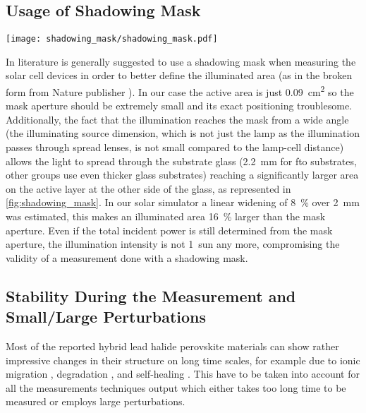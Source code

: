 	\subsection{Usage of Shadowing Mask}

		\begin{SCfigure}
			\centering
			\texttt{[image: shadowing\_mask/shadowing\_mask.pdf]}
			\label{fig:shadowing_mask}
		\end{SCfigure}

		In literature is generally suggested to use a shadowing mask when measuring the solar cell devices in order to better define the illuminated area (as in the broken \cite{Brinser2017} form from Nature publisher \cite{NatureResearch2017}).
		In our case the active area is just \SI{0.09}{\square\cm} so the mask aperture should be extremely small and its exact positioning troublesome.
		Additionally, the fact that the illumination reaches the mask from a wide angle (the illuminating source dimension, which is not just the lamp as the illumination passes through spread lenses, is not small compared to the lamp-cell distance) allows the light to spread through the substrate glass (\SI{2.2}{\mm} for \gls{fto} substrates, other groups use even thicker glass substrates) reaching a significantly larger area on the active layer at the other side of the glass, as represented in \cref{fig:shadowing_mask}.
		In our solar simulator a linear widening of 8~\% over \SI{2}{\mm} was estimated, this makes an illuminated area 16~\% larger than the mask aperture.
		Even if the total incident power is still determined from the mask aperture, the illumination intensity is not 1~sun any more, compromising the validity of a measurement done with a shadowing mask.


	\subsection{Stability During the Measurement and Small/Large Perturbations}

		Most of the reported hybrid lead halide perovskite materials can show rather impressive changes in their structure on long time scales, for example due to ionic migration \cite{Calado2016}, degradation \cite{OKane2019}, and self-healing \cite{Ceratti2018}.
		This have to be taken into account for all the measurements techniques output which either takes too long time to be measured or employs large perturbations.


